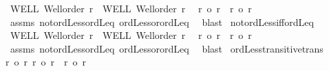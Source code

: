 \begin{isabellebody}
\ WELL{\isacharcolon}{\kern0pt}\ {\isachardoublequoteopen}Well{\isacharunderscore}{\kern0pt}order\ r{\isachardoublequoteclose}\ \ WELL{\isacharprime}{\kern0pt}{\isacharcolon}{\kern0pt}\ {\isachardoublequoteopen}Well{\isacharunderscore}{\kern0pt}order\ r{\isacharprime}{\kern0pt}{\isachardoublequoteclose}\isanewline
{}\ {\isachardoublequoteopen}{\isacharparenleft}{\kern0pt}{\isasymnot}\ r{\isacharprime}{\kern0pt}\ {\isasymle}o\ r{\isacharparenright}{\kern0pt}\ {\isacharequal}{\kern0pt}\ {\isacharparenleft}{\kern0pt}r\ {\isacharless}{\kern0pt}o\ r{\isacharprime}{\kern0pt}{\isacharparenright}{\kern0pt}{\isachardoublequoteclose}\isanewline
%
\isadelimproof
%
\endisadelimproof
%
\isatagproof
{}\isamarkupfalse%
\ assms\ not{\isacharunderscore}{\kern0pt}ordLess{\isacharunderscore}{\kern0pt}ordLeq\ ordLess{\isacharunderscore}{\kern0pt}or{\isacharunderscore}{\kern0pt}ordLeq\ \isamarkupfalse%
\ blast%
\endisatagproof
{\isafoldproof}%
%
\isadelimproof
\isanewline
%
\endisadelimproof
\isanewline
{}\isamarkupfalse%
\ not{\isacharunderscore}{\kern0pt}ordLess{\isacharunderscore}{\kern0pt}iff{\isacharunderscore}{\kern0pt}ordLeq{\isacharcolon}{\kern0pt}\isanewline
{}\ WELL{\isacharcolon}{\kern0pt}\ {\isachardoublequoteopen}Well{\isacharunderscore}{\kern0pt}order\ r{\isachardoublequoteclose}\ \ WELL{\isacharprime}{\kern0pt}{\isacharcolon}{\kern0pt}\ {\isachardoublequoteopen}Well{\isacharunderscore}{\kern0pt}order\ r{\isacharprime}{\kern0pt}{\isachardoublequoteclose}\isanewline
{}\ {\isachardoublequoteopen}{\isacharparenleft}{\kern0pt}{\isasymnot}\ r{\isacharprime}{\kern0pt}\ {\isacharless}{\kern0pt}o\ r{\isacharparenright}{\kern0pt}\ {\isacharequal}{\kern0pt}\ {\isacharparenleft}{\kern0pt}r\ {\isasymle}o\ r{\isacharprime}{\kern0pt}{\isacharparenright}{\kern0pt}{\isachardoublequoteclose}\isanewline
%
\isadelimproof
%
\endisadelimproof
%
\isatagproof
{}\isamarkupfalse%
\ assms\ not{\isacharunderscore}{\kern0pt}ordLess{\isacharunderscore}{\kern0pt}ordLeq\ ordLess{\isacharunderscore}{\kern0pt}or{\isacharunderscore}{\kern0pt}ordLeq\ \isamarkupfalse%
\ blast%
\endisatagproof
{\isafoldproof}%
%
\isadelimproof
\isanewline
%
\endisadelimproof
\isanewline
{}\isamarkupfalse%
\ ordLess{\isacharunderscore}{\kern0pt}transitive{\isacharbrackleft}{\kern0pt}trans{\isacharbrackright}{\kern0pt}{\isacharcolon}{\kern0pt}\isanewline
{\isachardoublequoteopen}{\isasymlbrakk}r\ {\isacharless}{\kern0pt}o\ r{\isacharprime}{\kern0pt}{\isacharsemicolon}{\kern0pt}\ r{\isacharprime}{\kern0pt}\ {\isacharless}{\kern0pt}o\ r{\isacharprime}{\kern0pt}{\isacharprime}{\kern0pt}{\isasymrbrakk}\ {\isasymLongrightarrow}\ r\ {\isacharless}{\kern0pt}o\ r{\isacharprime}{\kern0pt}{\isacharprime}{\kern0pt}{\isachardoublequoteclose}\isanewline

\end{isabellebody}
